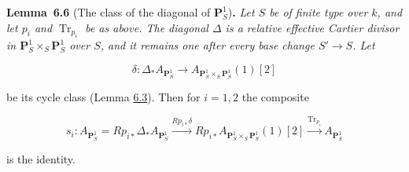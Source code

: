 \documentclass[11pt]{article}
\newenvironment{bpstatement}[2]{\par\addvspace{0.6\baselineskip}\noindent\textbf{#1}#2\textbf{.}\enspace\ignorespaces}
  {\par\addvspace{0.4\baselineskip}}
\newenvironment{bpstatementit}[2]{\begin{bpstatement}{#1}{#2}\itshape\ignorespaces}{\end{bpstatement}}
\begin{document}
\label{bp19}%
\begin{bpstatementit}{Lemma~6.6}{ (The class of the diagonal of $\mathbf P^1_S$)}
Let \(S\) be of finite type over \(k\), and let \(p_i\) and \(\operatorname{Tr}_{p_i}\) be as above. The diagonal \(\Delta\) is a relative effective Cartier divisor in \(\mathbf P^1_S\times_S\mathbf P^1_S\) over \(S\), and it remains one after every base change \(S'\to S\). Let

\[
\delta:\Delta_*A_{\mathbf P^1_S}\longrightarrow
A_{\mathbf P^1_S\times_S\mathbf P^1_S}(1)[2]
\]

be its cycle class (Lemma \hyperref[bp11]{6.3}). Then for \(i=1,2\) the composite

\[
s_i:A_{\mathbf P^1_S}=Rp_{i*}\Delta_*A_{\mathbf P^1_S}
\xrightarrow{Rp_{i*}\delta}
Rp_{i*}A_{\mathbf P^1_S\times_S\mathbf P^1_S}(1)[2]
\xrightarrow{\operatorname{Tr}_{p_i}}A_{\mathbf P^1_S}
\tag{6.6}
\]

is the identity.
\end{bpstatementit}
\end{document}
